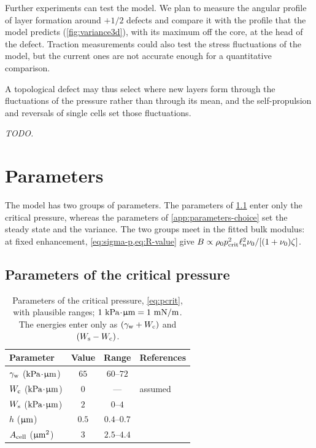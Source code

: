 \documentclass[aps,pre,reprint,superscriptaddress,longbibliography,nofootinbib
]{revtex4-2}
\newcommand{\skel}[1]{\textcolor{gray!70!black}{\itshape #1}}
\begin{document}
Further experiments can test the model. We plan to measure
the angular profile of layer formation around $+1/2$
defects and compare it with the profile that the model
predicts (\cref{fig:variance3d}), with its maximum off the
core, at the head of the defect. Traction measurements
could also test the stress fluctuations of the model, but
the current ones are not accurate enough for a quantitative
comparison.

A topological defect may thus select where new layers form
through the fluctuations of the pressure rather than
through its mean, and the self-propulsion and reversals of
single cells set those fluctuations.

\begin{acknowledgments}
\skel{TODO.}
\end{acknowledgments}


\appendix
{}


\section{Parameters}
\label{app:parameters}
The model has two groups of parameters. The parameters of
\cref{app:parameters-extrusion} enter only the critical
pressure, whereas the parameters of
\cref{app:parameters-choice} set the steady state and the
variance. The two groups meet in the fitted bulk modulus:
at fixed enhancement, \cref{eq:sigma-p,eq:R-value} give
$B\propto\rho_0p_{\rm crit}^2\ell_{\rm n}^2\nu_0/[(1+\nu_0)\zeta]$.

\subsection{Parameters of the critical pressure}
\label{app:parameters-extrusion}
\begin{table}[h!]
\centering
\begin{tabular}{l c c l}
\hline
Parameter & Value & Range & References \\
\hline
$\gamma_{\rm w}$ ($\text{kPa}\mkern1mu\mathord{\cdot}\mkern1mu\upmu\mathrm{m}$) & $65$ & $60$--$72$ & \cite{bourque2025active,islam2020,vargaftik1983} \\
$W_{\rm c}$ ($\text{kPa}\mkern1mu\mathord{\cdot}\mkern1mu\upmu\mathrm{m}$) & $0$ & --- & assumed \\
$W_{\rm s}$ ($\text{kPa}\mkern1mu\mathord{\cdot}\mkern1mu\upmu\mathrm{m}$) & $2$ & $0$--$4$ & \cite{bayoudh2006quantification,duanisassaf2024factors} \\
$h$ ($\upmu\mathrm{m}$) & $0.5$ & $0.4$--$0.7$ & \cite{han2025local,starruss2012pattern} \\
${A_{\rm cell}}$ ($\upmu\mathrm{m}^2$) & $3$ & $2.5$--$4.4$ & \cite{wu2009periodic,starruss2012pattern,han2025local} \\
\hline
\end{tabular}
\caption{Parameters of the critical pressure, \cref{eq:pcrit}, with plausible ranges;
  $1~\text{kPa}\mkern1mu\mathord{\cdot}\mkern1mu\upmu\mathrm{m}=1~\mathrm{mN/m}$. The energies enter only as $(\gamma_{\rm w}+W_{\rm c})$ and
  $(W_{\rm s}-W_{\rm c})$.}
\label{tab:pcrit}
\end{table}
\end{document}
